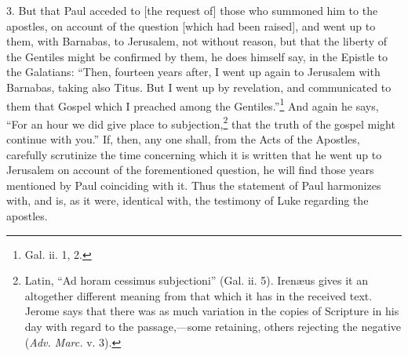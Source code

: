 3. But that Paul acceded to [the request of] those who summoned him to the apostles, on account of the question [which had been raised], and went up to them, with Barnabas, to Jerusalem, not without reason, but that the liberty of the Gentiles might be confirmed by them, he does himself say, in the Epistle to the Galatians: “Then, fourteen years after, I went up again to Jerusalem with Barnabas, taking also Titus. But I went up by revelation, and communicated to them that Gospel which I preached among the Gentiles.”\footnote{Gal. ii. 1, 2.} And again he says, “For an hour we did give place to subjection,\footnote{Latin, “Ad horam cessimus subjectioni” (Gal. ii. 5). Irenæus gives it an altogether different meaning from that which it has in the received text. Jerome says that there was as much variation in the copies of Scripture in his day with regard to the passage,—some retaining, others rejecting the negative (\emph{Adv. Marc.} v. 3).} that the truth of the gospel might continue with you.” If, then, any one shall, from the Acts of the Apostles, carefully scrutinize the time concerning which it is written that he went up to Jerusalem on account of the forementioned question, he will find those years mentioned by Paul coinciding with it. Thus the statement of Paul harmonizes with, and is, as it were, identical with, the testimony of Luke regarding the apostles.


